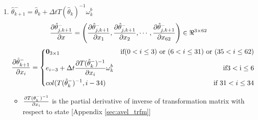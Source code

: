 \begin{enumerate}
\item $\hat{\theta}_{k+1}^- = \hat{\theta}_k + \Delta t T(\hat{\theta}_k)^{-1} \omega_k^b$
\begin{equation}
\label{eq:dthetadx}
\frac{\partial {\hat{\theta}_{j,k+1}^-}}{\partial {x}} = \left(\frac{\partial {\hat{\theta}_{j,k+1}^-}}{\partial {x_{1}}}, \frac{\partial {\hat{\theta}_{j,k+1}^-}}{\partial {x_{2}}}, \cdots , \frac{\partial {\hat{\theta}_{j,k+1}^-}}{\partial {x_{62}}}\right) \in \Re^{3 \times 62}
\end{equation}
\[
 \frac{\partial {\hat{\theta}_{k+1}^-}}{\partial {x_{i}}} = \left\lbrace
  \!\begin{aligned}
   &\textbf{0}_{3 \times 1} &\text{if}(0 < i \leq 3) \text{ or }(6 < i \leq 31) \text{ or } (35 < i \leq 62) \\
   &e_{i-3} + \Delta t \frac{\partial {T(\hat{\theta}_k^-)^{-1}}}{\partial {x_i}}\omega_k^b & \text{if}3< \text{i} \leq 6 \\
   &col(T(\hat{\theta}_k^-)^{-1},i-34) & \text{if } 31 < i \leq 34 \\
  \end{aligned} \right.
\]
\begin{itemize}
\item $\frac{\partial {T(\theta_k^-)^{-1}}}{\partial {x_i}}$ is the partial derivative of inverse of transformation matrix with respect to state [Appendix \ref{sec:avel_trfm}] 
\end{itemize}


\end{enumerate}
